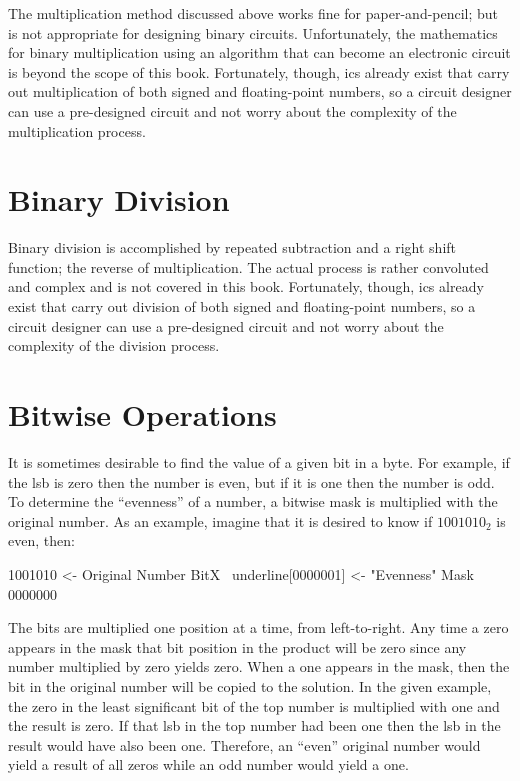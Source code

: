 The multiplication method discussed above works fine for paper-and-pencil; but is not appropriate for designing binary circuits. Unfortunately, the mathematics for binary multiplication using an algorithm that can become an electronic circuit is beyond the scope of this book. Fortunately, though, \glspl{ic} already exist that carry out multiplication of both signed and floating-point numbers, so a circuit designer can use a pre-designed circuit and not worry about the complexity of the multiplication process.

\section{Binary Division}
\label{MO:sec:binary_division}

Binary division is accomplished by repeated subtraction and a right shift function; the reverse of multiplication. The actual process is rather convoluted and complex and is not covered in this book. Fortunately, though, \glspl{ic} already exist that carry out division of both signed and floating-point numbers, so a circuit designer can use a pre-designed circuit and not worry about the complexity of the division process.

\section{Bitwise Operations}
\label{MO:sec:bitwise_operations}

It is sometimes desirable to find the value of a given bit in a byte. For example, if the \gls{lsb} is zero then the number is even, but if it is one then the number is odd. To determine the ``evenness'' of a number, a bitwise mask is multiplied with the original number. As an example, imagine that it is desired to know if $ 1001010_2 $ is even, then:

\begin{binDisp}[commandchars=~\[\]]
         1001010  <- Original Number
    BitX ~underline[0000001]  <- "Evenness" Mask
         0000000
\end{binDisp}

The bits are multiplied one position at a time, from left-to-right. Any time a zero appears in the mask that bit position in the product will be zero since any number multiplied by zero yields zero. When a one appears in the mask, then the bit in the original number will be copied to the solution. In the given example, the zero in the least significant bit of the top number is multiplied with one and the result is zero. If that \gls{lsb} in the top number had been one then the \gls{lsb} in the result would have also been one. Therefore, an ``even'' original number would yield a result of all zeros while an odd number would yield a one.

